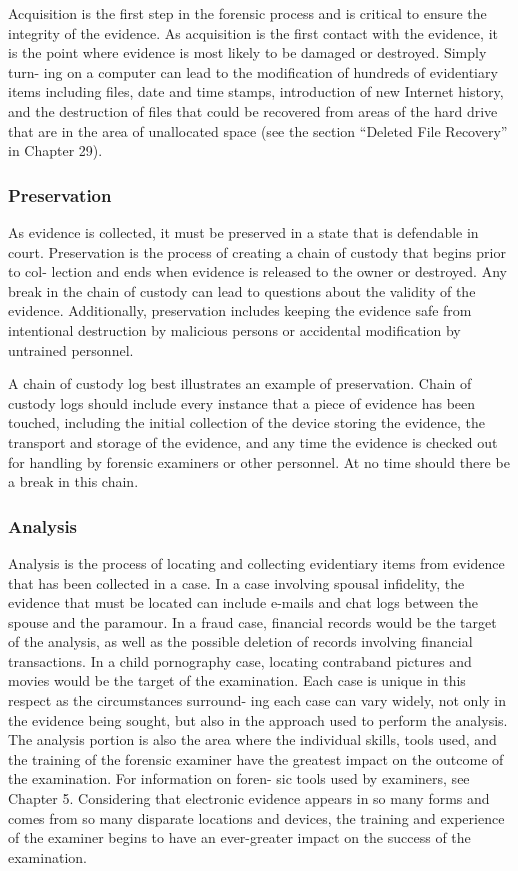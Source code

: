 Acquisition is the first step in the forensic process and is critical to ensure the
integrity of the evidence. As acquisition is the first contact with the evidence, it is
the point where evidence is most likely to be damaged or destroyed. Simply turn-
ing on a computer can lead to the modification of hundreds of evidentiary items
including files, date and time stamps, introduction of new Internet history, and
the destruction of files that could be recovered from areas of the hard drive that
are in the area of unallocated space (see the section “Deleted File Recovery” in
Chapter 29).

\subsubsection{Preservation}

As evidence is collected, it must be preserved in a state that is defendable in court.
Preservation is the process of creating a chain of custody that begins prior to col-
lection and ends when evidence is released to the owner or destroyed. Any break
in the chain of custody can lead to questions about the validity of the evidence.
Additionally, preservation includes keeping the evidence safe from intentional
destruction by malicious persons or accidental modification by untrained personnel.

A chain of custody log best illustrates an example of preservation. Chain
of custody logs should include every instance that a piece of evidence has been
touched, including the initial collection of the device storing the evidence, the
transport and storage of the evidence, and any time the evidence is checked out for
handling by forensic examiners or other personnel. At no time should there be a
break in this chain.

\subsubsection{Analysis}

Analysis is the process of locating and collecting evidentiary items from evidence
that has been collected in a case. In a case involving spousal infidelity, the evidence
that must be located can include e-mails and chat logs between the spouse and the
paramour. In a fraud case, financial records would be the target of the analysis, as
well as the possible deletion of records involving financial transactions. In a child
pornography case, locating contraband pictures and movies would be the target of
the examination. Each case is unique in this respect as the circumstances surround-
ing each case can vary widely, not only in the evidence being sought, but also in the
approach used to perform the analysis. The analysis portion is also the area where
the individual skills, tools used, and the training of the forensic examiner have
the greatest impact on the outcome of the examination. For information on foren-
sic tools used by examiners, see Chapter 5. Considering that electronic evidence
appears in so many forms and comes from so many disparate locations and devices,
the training and experience of the examiner begins to have an ever-greater impact
on the success of the examination.

